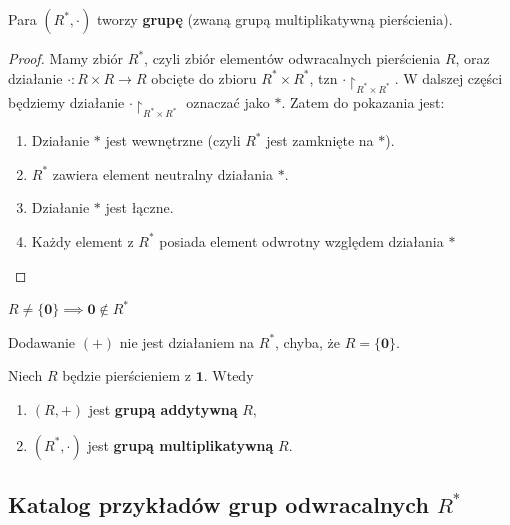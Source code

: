 \begin{fact}
    Para $(R^*, \cdot)$ tworzy \textbf{grupę} (zwaną grupą multiplikatywną pierścienia).
\end{fact}
\begin{proof}
	Mamy zbiór $R^{\ast}$, czyli zbiór elementów odwracalnych pierścienia $R$, oraz działanie $\cdot : R \times R \to R$ obcięte do zbioru $R^{\ast} \times R^{\ast}$, tzn $\cdot \restriction_{\scriptscriptstyle R^{\ast} \times R^{\ast} } $. W dalszej części będziemy działanie  $\cdot \restriction_{\scriptscriptstyle R^{\ast} \times R^{\ast}}$ oznaczać jako $\ast $.
	Zatem do pokazania jest:
	\begin{enumerate}[label=\arabic*)]
		\item Działanie $\ast$ jest wewnętrzne (czyli $R^{\ast} $ jest zamknięte na $\ast$).
		\item $R^{\ast}$ zawiera element neutralny działania $\ast$. 
		\item Działanie $\ast$ jest łączne.
		 \item Każdy element z $R^{\ast}$ posiada element odwrotny względem działania $\ast$
	\end{enumerate}
\end{proof} 
\begin{remark}
	$R \neq \{\mathbf{0}\} \implies \mathbf{0}\not\in R^{\ast}$
\end{remark} 
\begin{remark}
	Dodawanie $\left( + \right) $ nie jest działaniem na $R^{\ast} $, chyba, że $R = \{\mathbf{0}\} $.
\end{remark} 
\begin{definition}
	Niech $R$ będzie pierścieniem z $\mathbf{1}$. Wtedy
	\begin{enumerate}[label=\arabic*)]
		\item $\left( R,+ \right) $ jest \textbf{grupą addytywną} $R$,
		\item $\left( R^{\ast}, \cdot  \right) $ jest \textbf{grupą multiplikatywną} $R$.
	\end{enumerate}
\end{definition} 

\subsection*{Katalog przykładów grup odwracalnych $R^{\ast}$}

